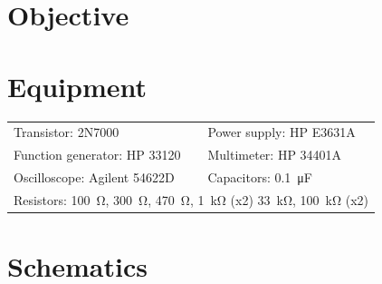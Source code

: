 

\section{Objective}
\label{sec:objective}


\section{Equipment}
\label{sec:equipment}

\begin{tabular}{ll}
  \centering
  Transistor: 2N7000               & Power supply: HP E3631A            \\
  Function generator: HP 33120 & Multimeter: HP 34401A              \\
  Oscilloscope: Agilent 54622D & Capacitors: \SI{0.1}{\micro\farad} \\
  \multicolumn{2}{l}{Resistors: \SI{100}{\ohm}, \SI{300}{\ohm}, \SI{470}{\ohm}, \SI{1}{\kilo\ohm} (x2) \SI{33}{\kilo\ohm}, \SI{100}{\kilo\ohm} (x2)} \\
\end{tabular}

\section{Schematics}
\label{sec:schematics}


